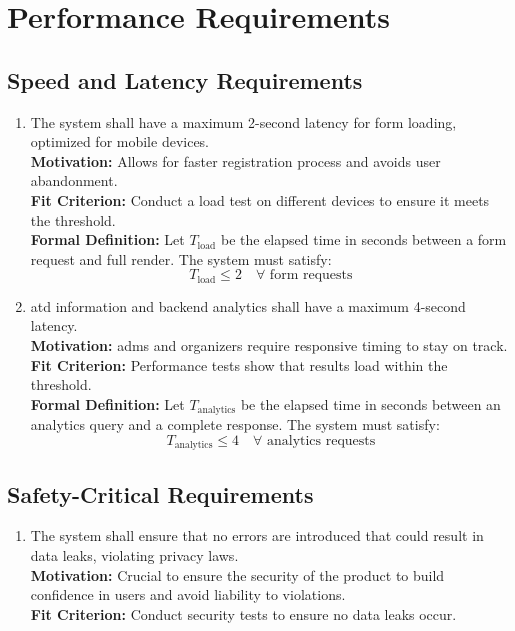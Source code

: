 \documentclass[12pt]{article}
\begin{document}
\section{Performance Requirements}
\subsection{Speed and Latency Requirements}
\begin{enumerate}[label=\bfseries SL-\arabic*:, wide=0pt, leftmargin=*, ref=\bfseries SL-\arabic*]
  \item \label{SL1} The system shall have a maximum 2-second latency for form loading, optimized 
  for mobile devices.\\[2mm]
  {\bf Motivation:} Allows for faster registration process and avoids user abandonment.\\
  {\bf Fit Criterion:} Conduct a load test on different devices to ensure it meets the threshold.\\
  {\bf Formal Definition:} Let $T_{\text{load}}$ be the elapsed time in seconds between a form 
  request and full render. The system must satisfy:
  \[
    T_{\text{load}} \leq 2 \quad \forall \text{ form requests}
  \]
  \item \label{SL2} \Gls{atd} information and backend analytics shall have a maximum 4-second 
  latency.\\[2mm]
  {\bf Motivation:} \Glspl{adm} and organizers require responsive timing to stay on track.\\
  {\bf Fit Criterion:} Performance tests show that results load within the threshold. \\
  {\bf Formal Definition:} Let $T_{\text{analytics}}$ be the elapsed time in seconds between an 
  analytics query and a complete response. The system must satisfy:
  \[
    T_{\text{analytics}} \leq 4 \quad \forall \text{ analytics requests}
  \]
\end{enumerate}

\subsection{Safety-Critical Requirements}
\begin{enumerate}[label=\bfseries SC-\arabic*:, wide=0pt, leftmargin=*, ref=\bfseries SC-\arabic*]
  \item \label{SC1} The system shall ensure that no errors are introduced that could result in data leaks, violating privacy laws.\\
  {\bf Motivation:} Crucial to ensure the security of the product to build confidence in users and avoid liability to violations.\\
  {\bf Fit Criterion:} Conduct security tests to ensure no data leaks occur.
\end{enumerate}
\end{document}
